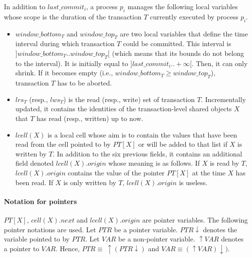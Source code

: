 In addition to  $last\_commit_i$, a process $p_i$ manages  the 
following local variables whose scope  is the duration of the transaction $T$ 
currently executed by process $p_i$. 
%
\begin{itemize}  
\vspace{-0.2cm}
\item   
$window\_bottom_T$ and   $window\_top_T$  are  two  local variables
that  define  the  time  interval  during  which  transaction  $T$ could 
be committed. This interval is $]window\_bottom_T..window\_top_T[$ 
(which means that its bounds do not belong to the interval). 
It is initially equal to  $]last\_commit_i..+\infty[$. 
Then, it can only shrink.  If it becomes empty (i.e., 
$window\_bottom_T \geq window\_top_T$), transaction $T$ has to be aborted. 
%
\vspace{-0.2cm}
\item  
$lrs_T$  (resp.,  $lws_T$) is  the read (resp.,  write)  set  of transaction 
$T$.  Incrementally updated, it  contains the identities of the 
transaction-level  shared  objects $X$ that $T$ has   read (resp., written)
up to now.  
%
\vspace{-0.2cm}
\item 
$lcell(X)$ is a local cell whose aim is to contain the values that have been 
read from the cell pointed to by $PT[X]$ or will be added to that list if 
$X$ is  written  by $T$. 
In addition  to the six previous  fields, it contains  an additional field
denoted $lcell(X).origin$ whose meaning is as follows.
%
If $X$ is read by $T$,  $lcell(X).origin$ contains  
the value of the pointer $PT[X]$ at the time $X$ has been read.
If $X$ is only written  by $T$,  $lcell(X).origin$ is useless. 
\end{itemize}


\paragraph{Notation for pointers}
$PT[X]$, $cell(X).next$ and  $lcell(X).origin$ are pointer variables. 
The following pointer notations are used. Let $PTR$ be a pointer
variable.  $PTR \downarrow$  denotes the variable pointed to by $PTR$. 
Let $ \mathit{VAR}$ be a non-pointer  variable.  $\uparrow \mathit{VAR}$  
denotes a pointer  to  $\mathit{VAR}$.  Hence,  
$PTR \equiv ~ \uparrow (PTR \downarrow)$ and 
$\mathit{VAR} \equiv (\uparrow  \mathit{VAR}) \downarrow)$. 







